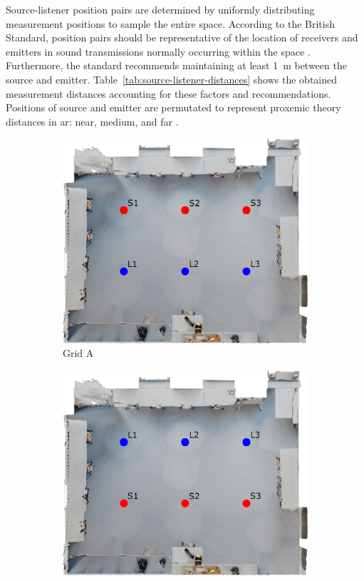 

Source-listener position pairs are determined by uniformly distributing measurement positions to sample the entire space. According to the British Standard, position pairs should be representative of the location of receivers and emitters in sound transmissions normally occurring within the space \citep{bs3382-1}. Furthermore, the standard recommends maintaining at least \qty{1}{\metre} between the source and emitter. Table~\ref{tab:source-listener-distances} shows the obtained measurement distances accounting for these factors and recommendations. Positions of source and emitter are permutated to represent proxemic theory distances in \acrshort{ar}: near, medium, and far \citep{huang2022proxemics}.

\begin{figure}
    \centering
    \begin{subfigure}[t]{0.45\textwidth}
       \centering
       \includegraphics[width=\textwidth]{grid-a}
       \caption{Grid A}
       \label{fig:grid-a-probes}
    \end{subfigure}
    \begin{subfigure}[t]{0.45\textwidth}
       \centering
       \includegraphics[width=\textwidth]{grid-b}

\end{subfigure}
\end{figure}
